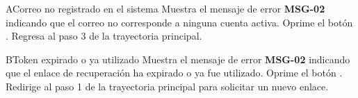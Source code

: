 \begin{UCtrayectoriaA}{A}{Correo no registrado en el sistema}
	\UCpaso Muestra el mensaje de error \textbf{MSG-02} indicando que el correo no corresponde a ninguna cuenta activa.
	\UCpaso[\UCactor] Oprime el botón .
	\UCpaso Regresa al paso 3 de la trayectoria principal.
\end{UCtrayectoriaA}

\begin{UCtrayectoriaA}{B}{Token expirado o ya utilizado}
	\UCpaso Muestra el mensaje de error \textbf{MSG-02} indicando que el enlace de recuperación ha expirado o ya fue utilizado.
	\UCpaso[\UCactor] Oprime el botón .
	\UCpaso Redirige al paso 1 de la trayectoria principal para solicitar un nuevo enlace.
\end{UCtrayectoriaA}

